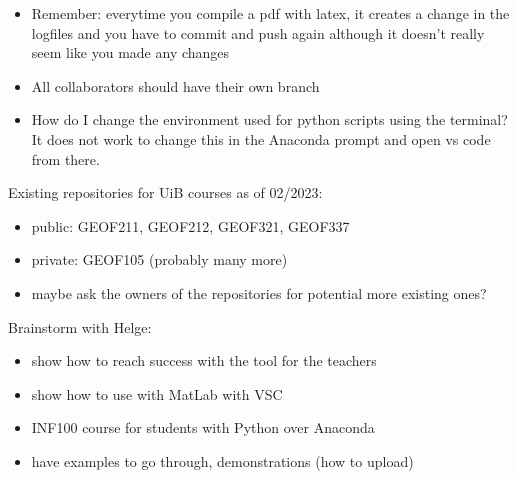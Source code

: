 \documentclass{article}
\begin{document}
    \begin{itemize}
        \item Remember: everytime you compile a pdf with latex, it creates a 
        change in the logfiles and you have to commit and push again although 
        it doesn't really seem like you made any changes
        \item All collaborators should have their own branch
        \item How do I change the environment used for python scripts using 
        the terminal? It does not work to change this in the Anaconda prompt 
        and open vs code from there. 
    \end{itemize}

Existing repositories for UiB courses as of 02/2023:
\begin{itemize}
    \item public: GEOF211, GEOF212, GEOF321, GEOF337
    \item private: GEOF105 (probably many more)
    \item maybe ask the owners of the repositories for potential more existing ones?
\end{itemize}

Brainstorm with Helge:
\begin{itemize}
    \item show how to reach success with the tool for the teachers
    \item show how to use with MatLab with VSC
    \item INF100 course for students with Python over Anaconda
    \item have examples to go through, demonstrations (how to upload)
\end{itemize}
\end{document}
